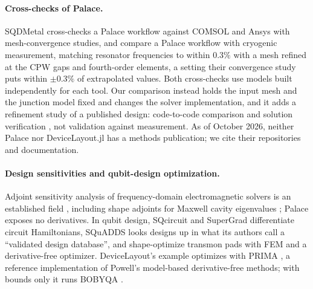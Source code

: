 \documentclass{anvil-paper}
\begin{document}
\paragraph{Cross-checks of Palace.}
SQDMetal \citep{sommers2025open} cross-checks a Palace workflow against
COMSOL and Ansys with mesh-convergence studies, and
\citet{ye2025electromagnetic} compare a Palace workflow with cryogenic
measurement, matching resonator frequencies to within $0.3\%$ with a mesh
refined at the CPW gaps and fourth-order elements, a setting their
convergence study puts within $\pm0.3\%$ of extrapolated values. Both cross-checks use models built
independently for each tool. Our comparison instead holds the input mesh
and the junction model fixed and changes the solver implementation, and it
adds a refinement study of a published design: code-to-code comparison and
solution verification \citep{oberkampf2010verification}, not validation
against measurement. As of October 2026, neither Palace nor DeviceLayout.jl has a
methods publication; we cite their repositories and documentation.

\paragraph{Design sensitivities and qubit-design optimization.}
Adjoint sensitivity analysis of frequency-domain electromagnetic solvers is
an established field \citep{nikolova2004adjoint}, including shape adjoints
for Maxwell cavity eigenvalues \citep{akcelik2005adjoint}; Palace exposes no
derivatives.
In qubit design, SQcircuit \citep{rajabzadeh2023analysis} and
SuperGrad \citep{wang2025supergrad} differentiate circuit Hamiltonians,
SQuADDS \citep{shanto2024squadds} looks designs up in what its authors
call a ``validated design database'', and \citet{eun2023shape} shape-optimize transmon pads with FEM
and a derivative-free optimizer.
DeviceLayout's example optimizes with PRIMA \citep{zhang2023prima}, a
reference implementation of Powell's model-based derivative-free methods;
with bounds only it runs BOBYQA \citep{powell2009bobyqa}.
\end{document}
